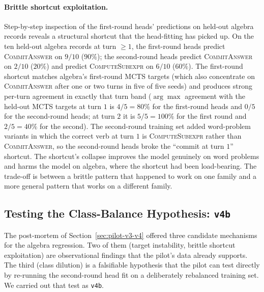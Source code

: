 \paragraph{Brittle shortcut exploitation.} Step-by-step inspection of
the first-round heads' predictions on held-out algebra records
reveals a structural shortcut that the head-fitting has picked up.
On the ten held-out algebra records at turn $\geq 1$, the
first-round heads predict \textsc{CommitAnswer} on $9/10$ ($90\%$);
the second-round heads predict \textsc{CommitAnswer} on $2/10$
($20\%$) and predict \textsc{ComputeSubexpr} on $6/10$ ($60\%$). The
first-round shortcut matches algebra's first-round MCTS targets
(which also concentrate on \textsc{CommitAnswer} after one or two
turns in five of five seeds) and produces strong per-turn agreement
in exactly that turn band ($\arg\max$ agreement with the held-out
MCTS targets at turn $1$ is $4/5 = 80\%$ for the first-round heads
and $0/5$ for the second-round heads; at turn $2$ it is
$5/5 = 100\%$ for the first round and $2/5 = 40\%$ for the second).
The second-round training set added word-problem variants in which
the correct verb at turn $1$ is \textsc{ComputeSubexpr} rather than
\textsc{CommitAnswer}, so the second-round heads broke the
``commit at turn $1$'' shortcut. The shortcut's collapse improves
the model genuinely on word problems and harms the model on algebra,
where the shortcut had been load-bearing. The trade-off is between a
brittle pattern that happened to work on one family and a more
general pattern that works on a different family.

\subsection{Testing the Class-Balance Hypothesis: \texttt{v4b}}
\label{sec:pilot-v4b}

The post-mortem of Section~\ref{sec:pilot-v3-v4} offered three
candidate mechanisms for the algebra regression. Two of them
(target instability, brittle shortcut exploitation) are observational
findings that the pilot's data already supports. The third (class
dilution) is a falsifiable hypothesis that the pilot can test directly
by re-running the second-round head fit on a deliberately rebalanced
training set. We carried out that test as \texttt{v4b}.

